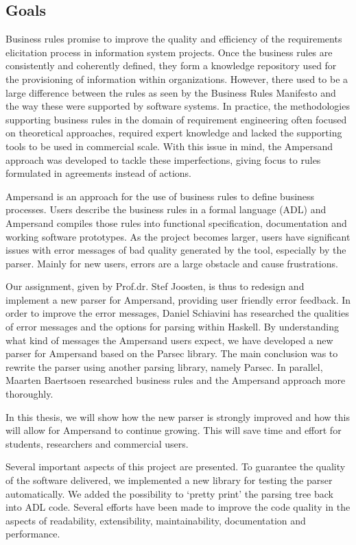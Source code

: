 
\subsection{Goals}
Business rules promise to improve the quality and efficiency of the requirements elicitation process in information system projects.
Once the business rules are consistently and coherently defined, they form a knowledge repository used for the provisioning of information within organizations.
However, there used to be a large difference between the rules as seen by the Business Rules Manifesto and the way these were supported by software systems. 
In practice, the methodologies supporting business rules in the domain of requirement engineering often focused on theoretical approaches, required expert knowledge and lacked the supporting tools to be used in commercial scale.
With this issue in mind, the Ampersand approach was developed to tackle these imperfections, giving focus to rules formulated in agreements instead of actions.

Ampersand is an approach for the use of business rules to define business processes.
Users describe the business rules in a formal language (ADL) and Ampersand compiles those rules into functional specification, documentation and working software prototypes.
As the project becomes larger, users have significant issues with error messages of bad quality generated by the tool, especially by the parser.
Mainly for new users, errors are a large obstacle and cause frustrations.

Our assignment, given by Prof.dr. Stef Joosten, is thus to redesign and implement a new parser for Ampersand, providing user friendly error feedback.
In order to improve the error messages, Daniel Schiavini has researched the qualities of error messages and the options for parsing within Haskell.
By understanding what kind of messages the Ampersand users expect, we have developed a new parser for Ampersand based on the Parsec library.
The main conclusion was to rewrite the parser using another parsing library, namely Parsec.
In parallel, Maarten Baertsoen researched business rules and the Ampersand approach more thoroughly.

In this thesis, we will show how the new parser is strongly improved and how this will allow for Ampersand to continue growing.
This will save time and effort for students, researchers and commercial users.

Several  important aspects of this project are presented.
To guarantee the quality of the software delivered, we implemented a new library for testing the parser automatically.
We added the possibility to `pretty print' the parsing tree back into ADL code.
Several efforts have been made to improve the code quality in the aspects of readability, extensibility, maintainability, documentation and performance.

